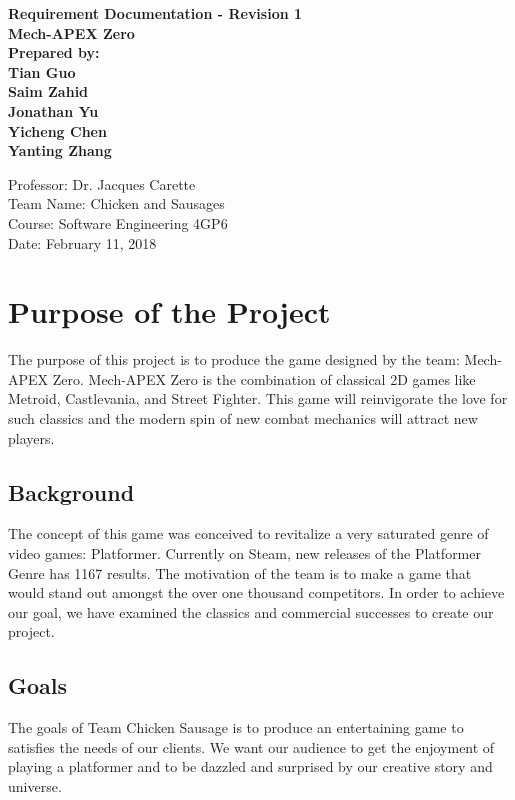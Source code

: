 \documentclass{article}
\begin{document}
	\begin{center}
        \vspace*{1cm}
        \textbf{\Large Requirement Documentation - Revision 1}
        \vspace{0.5cm}
        \textbf{\Large  \\Mech-APEX Zero}
        \vspace{1cm}
        \textbf{\\Prepared by: \\ Tian Guo\\Saim Zahid\\Jonathan Yu\\ Yicheng Chen \\Yanting Zhang }
        \vfill
        \vspace{0.8cm}
        \begin{flushright}
        Professor: Dr. Jacques Carette\\
        Team Name: Chicken and Sausages\\
        Course: Software Engineering 4GP6\\
        Date: February 11, 2018
        \end{flushright}
    \end{center}
	\newpage
	\tableofcontents

	\section{Purpose of the Project}
	The purpose of this project is to produce the game designed by the team: Mech-APEX Zero. Mech-APEX Zero is the combination of classical 2D games like Metroid, Castlevania, and Street Fighter. This game will reinvigorate the love for such classics and the modern spin of new combat mechanics will attract new players.

	\subsection{Background}
	The concept of this game was conceived to revitalize a very saturated genre of video games: Platformer. Currently on Steam, new releases of the Platformer Genre has 1167 results. The motivation of the team is to make a game that would stand out amongst the over one thousand competitors. In order to achieve our goal, we have examined the classics and commercial successes to create our project.

	\subsection{Goals}
	The goals of Team Chicken Sausage is to produce an entertaining game to satisfies the needs of our clients. We want our audience to get the enjoyment of playing a platformer and to be dazzled and surprised by our creative story and universe.
\end{document}
